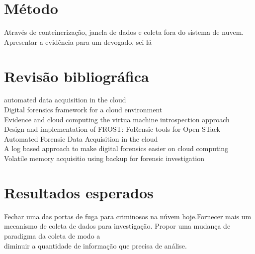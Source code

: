 \documentclass[12pt,				%
	openright,			%
	oneside,			%
	a4paper,			%
	english,			%
	brazil				%
	]{abntex2}
\begin{document}
\chapter{Método} \label{chap:metodo}
Através de conteinerização, janela de dados e coleta fora do sistema de nuvem. Apresentar a evidência para um devogado, sei lá

\chapter{Revisão bibliográfica} \label{chap:related}
automated data acquisition in the cloud \\
Digital forensics framework for a cloud environment \\
Evidence and cloud computing the virtua machine introspection approach \\
Design and implementation of FROST: FoRensic tools for Open STack \\
Automated Forensic Data Acquisition in the cloud \\
A log based approach to make digital forensics easier on cloud computing \\
Volatile memory acquisitio using backup for forensic investigation \\

\chapter{Resultados esperados} \label{chap:result}
Fechar uma das portas de fuga para criminosos na núvem hoje.Fornecer mais um mecanismo de coleta de dados para investigação. Propor uma mudança de paradigma da coleta de modo a \\
diminuir a quantidade de informação que precisa de análise.



\postextual

%  

\begin{comment}
\printindex
\end{comment}

\end{document}
